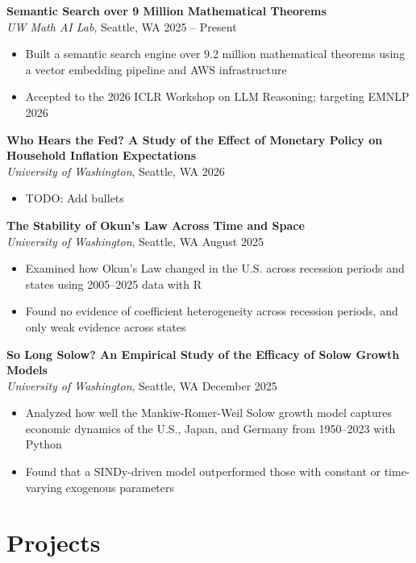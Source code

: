 \documentclass[11pt,letterpaper]{article}
\begin{document}
\textbf{Semantic Search over 9 Million Mathematical Theorems} \\
\textit{UW Math AI Lab}, Seattle, WA \hfill 2025 -- Present
\begin{itemize}
  \item Built a semantic search engine over 9.2 million mathematical theorems using a vector embedding pipeline and AWS infrastructure
  \item Accepted to the 2026 ICLR Workshop on LLM Reasoning; targeting EMNLP 2026
\end{itemize}
\vspace{4pt}
\textbf{Who Hears the Fed? A Study of the Effect of Monetary Policy on Household Inflation Expectations} \\
\textit{University of Washington}, Seattle, WA \hfill 2026
\begin{itemize}
  \item TODO: Add bullets
\end{itemize}
\vspace{4pt}
\textbf{The Stability of Okun's Law Across Time and Space} \\
\textit{University of Washington}, Seattle, WA \hfill August 2025
\begin{itemize}
  \item Examined how Okun's Law changed in the U.S. across recession periods and states using 2005--2025 data with R
  \item Found no evidence of coefficient heterogeneity across recession periods, and only weak evidence across states
\end{itemize}
\vspace{4pt}
\textbf{So Long Solow? An Empirical Study of the Efficacy of Solow Growth Models} \\
\textit{University of Washington}, Seattle, WA \hfill December 2025
\begin{itemize}
  \item Analyzed how well the Mankiw-Romer-Weil Solow growth model captures economic dynamics of the U.S., Japan, and Germany from 1950--2023 with Python
  \item Found that a SINDy-driven model outperformed those with constant or time-varying exogenous parameters
\end{itemize}

\section{Projects}
\end{document}

